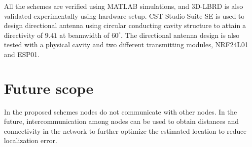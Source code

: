 \par All the schemes are verified using MATLAB simulations, and 3D-LBRD %
is also validated experimentally using hardware setup. CST Studio Suite SE is used to design directional antenna using circular conducting cavity structure to attain a directivity of $9.41$ at beamwidth of $60^\circ$. The directional antenna design is also tested with a physical cavity and two different transmitting modules, NRF24L01 and ESP01.

\section{Future scope}
In the proposed schemes nodes do not communicate with other nodes. In the future, intercommunication among nodes can be used to obtain distances and connectivity in the network to further optimize the estimated location to reduce localization error.







